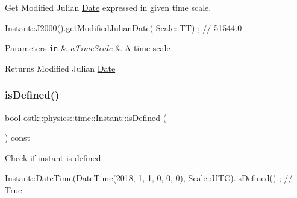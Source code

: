 Get Modified Julian \hyperlink{classostk_1_1physics_1_1time_1_1_date}{Date} expressed in given time scale. 


\begin{DoxyCode}
\hyperlink{classostk_1_1physics_1_1time_1_1_instant_a3f84d0c2d0b140326d3b172b54e3ffff}{Instant::J2000}().\hyperlink{classostk_1_1physics_1_1time_1_1_instant_aeaaf152c806c5f98ad03933ede05fe2d}{getModifiedJulianDate}(
      \hyperlink{namespaceostk_1_1physics_1_1time_adf23d37bd8641fb76a0e98ab46a70df7adf1f3edb9115acb0a1e04209b7a9937b}{Scale::TT}) ; \textcolor{comment}{// 51544.0}
\end{DoxyCode}



\begin{DoxyParams}[1]{Parameters}
\mbox{\tt in}  & {\em a\+Time\+Scale} & A time scale \\
\hline
\end{DoxyParams}
\begin{DoxyReturn}{Returns}
Modified Julian \hyperlink{classostk_1_1physics_1_1time_1_1_date}{Date} 
\end{DoxyReturn}
\mbox{\label{classostk_1_1physics_1_1time_1_1_instant_a3036cb77f2686a81c51f0c658881b3ff}} 
\subsubsection{\texorpdfstring{is\+Defined()}{isDefined()}}
{\footnotesize\ttfamily bool ostk\+::physics\+::time\+::\+Instant\+::is\+Defined (\begin{DoxyParamCaption}{ }\end{DoxyParamCaption}) const}



Check if instant is defined. 


\begin{DoxyCode}
\hyperlink{classostk_1_1physics_1_1time_1_1_instant_afd5725574a02389b80fad4baff313c8a}{Instant::DateTime}(\hyperlink{classostk_1_1physics_1_1time_1_1_instant_afd5725574a02389b80fad4baff313c8a}{DateTime}(2018, 1, 1, 0, 0, 0), 
      \hyperlink{namespaceostk_1_1physics_1_1time_adf23d37bd8641fb76a0e98ab46a70df7a9234324ddf6b4176b57d803a925b7961}{Scale::UTC}).\hyperlink{classostk_1_1physics_1_1time_1_1_instant_a3036cb77f2686a81c51f0c658881b3ff}{isDefined}() ; \textcolor{comment}{// True}
\end{DoxyCode}


